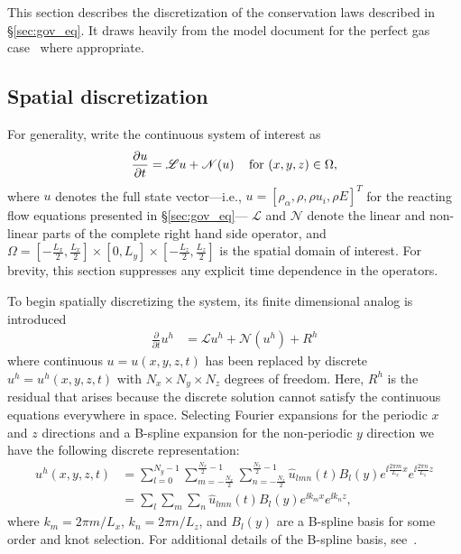 This section describes the discretization of the conservation laws
described in \S\ref{sec:gov_eq}.  It draws heavily from the model
document for the perfect gas case~\cite{Ulerich_SZPerfect} where
appropriate.

\subsection{Spatial discretization}
For generality, write the continuous system of interest as
%
\begin{equation*}
\frac{\partial u}{\partial t} = \mathscr{L}u + \mathscr{N}\!\left(u\right) \quad \mathrm{for} \,\, (x,y,z) \in \Omega,
\end{equation*}
% 
where $u$ denotes the full state vector---i.e., $u = [\rho_{\alpha},
  \rho, \rho u_i, \rho E]^T$ for the reacting flow equations presented
in \S\ref{sec:gov_eq}--- $\mathscr{L}$ and $\mathscr{N}$ denote the
linear and non-linear parts of the complete right hand side operator,
and $\Omega = \left[-\frac{L_x}{2},\frac{L_x}{2}\right] \times{}
[0,L_y] \times{} \left[-\frac{L_z}{2},\frac{L_z}{2}\right]$ is the
spatial domain of interest.  For brevity, this section suppresses any
explicit time dependence in the operators.

To begin spatially discretizing the system, its finite dimensional
analog is introduced
%
\begin{align}
  \frac{\partial}{\partial{}t} u^h
  &=
  \mathscr{L}u^h + \mathscr{N}\!\left(u^h\right) + R^h
  \label{eq:discrete_system_with_residual}
\end{align}
where continuous $u = u\!\left(x,y,z,t\right)$ has been replaced by
discrete $u^h = u^h\!\left(x,y,z,t\right)$ with
$N_x\times{}N_y\times{}N_z$ degrees of freedom.  Here, $R^h$ is the
residual that arises because the discrete solution cannot satisfy the
continuous equations everywhere in space.  Selecting Fourier
expansions for the periodic $x$ and $z$ directions and a B-spline
expansion for the non-periodic $y$ direction we have the following
discrete representation:
\begin{align}
u^h(x,y,z,t)
&=
  \sum_{l=0}^{N_y - 1}
  \sum_{m=-\frac{N_x}{2}}^{\frac{N_x}{2}-1}
  \sum_{n=-\frac{N_z}{2}}^{\frac{N_z}{2}-1}
  \hat{u}_{l m n}(t)
  B_l\!\left(y\right)
  e^{\ii\frac{2\pi{}m}{L_x}x}
  e^{\ii\frac{2\pi{}n}{L_z}z}
  \\
&=
  \sum_{l}\sum_{m}\sum_{n}
  \hat{u}_{l m n}(t)B_l\!\left(y\right)e^{\ii k_m x}e^{\ii k_n z},
  \label{eq:u_h_expansion}
\end{align}
where $k_m = 2\pi{}m/L_x$, $k_n = 2\pi{}n/L_z$, and
$B_l\!\left(y\right)$ are a B-spline basis for some order and knot
selection.  For additional details of the B-spline basis,
see~\cite{Ulerich_SZPerfect}.

